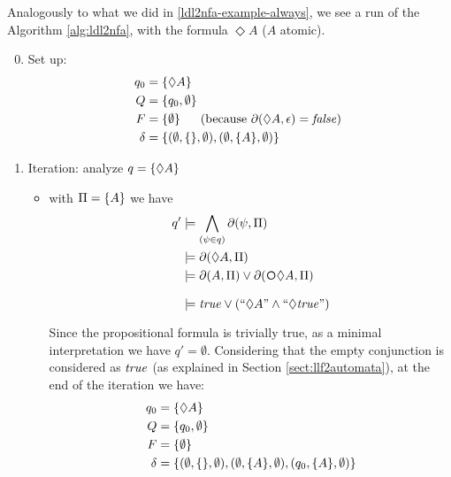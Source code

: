 \begin{example}\label{ldl2nfa-example-eventually}
	Analogously to what we did in \ref{ldl2nfa-example-always}, we see a run of the Algorithm \ref{alg:ldl2nfa}, with the \LTLf formula $\Diamond A$ ($A$ atomic).
	\begin{enumerate}
		\setcounter{enumi}{-1}
		\item Set up:
		\begin{align*}
		q_0 &= \{\Diamond A\}		\\
		Q &= \{q_0, \emptyset\}  \\
		F &= \{\emptyset\}  \hspace*{.18in} \ \text{(because $\partial\lparen \Diamond A, \epsilon\rparen=\mathit{false}$)}\ \\
		\delta &= \{(\emptyset, \{\}, \emptyset), (\emptyset, \{A\}, \emptyset)\}
		\end{align*}
		\item Iteration: analyze $q = \{\Diamond A\}$
		\begin{itemize}
			\item with $\Pi = \{A\}$ we have 
			\begin{align*}
			q' &\models \bigwedge_{(\psi\in q)} \Dfun{\psi}\\
			&\models \Dfun{\Diamond A}\\
			&\models \Dfun{A} \lOR \Dfun{\Next \Diamond A}\\
			&\models \true \lOR (``\Diamond A" \lAND ``\Diamond \true")
			\end{align*}
			Since the propositional formula is trivially true, as a minimal interpretation we have $q' = \emptyset$.
			Considering that the empty conjunction is considered as $\mathit{true}$ (as explained in Section \ref{sect:llf2automata}), at the end of the iteration we have:
			\begin{align*}
			q_0 &= \{\Diamond A\}		\\
			Q &= \{q_0, \emptyset\}  \\
			F &= \{\emptyset\}  \\
			\delta &= \{(\emptyset, \{\}, \emptyset), (\emptyset, \{A\}, \emptyset), (q_0, \{A\}, \emptyset)\}
			\end{align*}
			

\end{itemize}
\end{enumerate}
\end{example}
